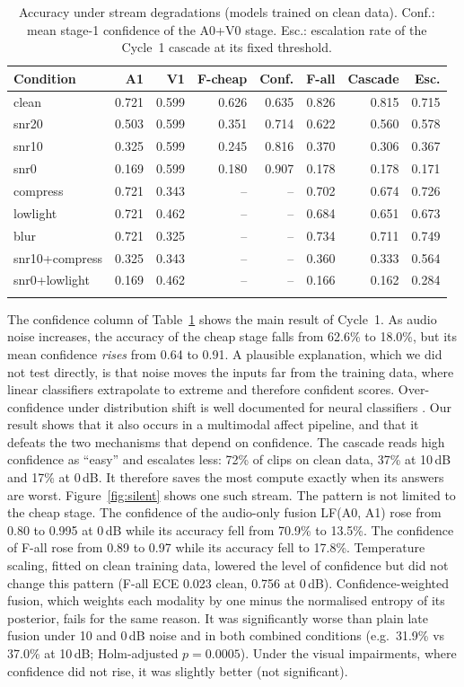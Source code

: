 \begin{table}[t]
\caption{Accuracy under stream degradations (models trained on clean data). Conf.: mean stage-1 confidence of the A0+V0 stage. Esc.: escalation rate of the Cycle~1 cascade at its fixed threshold.}\label{tab:robust}
\centering\footnotesize
\begin{tabular}{@{}lrrrrrrr@{}}
\toprule
Condition & A1 & V1 & F-cheap & Conf. & F-all & Cascade & Esc. \\
\midrule
clean & 0.721 & 0.599 & 0.626 & 0.635 & 0.826 & 0.815 & 0.715 \\
snr20 & 0.503 & 0.599 & 0.351 & 0.714 & 0.622 & 0.560 & 0.578 \\
snr10 & 0.325 & 0.599 & 0.245 & 0.816 & 0.370 & 0.306 & 0.367 \\
snr0 & 0.169 & 0.599 & 0.180 & 0.907 & 0.178 & 0.178 & 0.171 \\
compress & 0.721 & 0.343 & -- & -- & 0.702 & 0.674 & 0.726 \\
lowlight & 0.721 & 0.462 & -- & -- & 0.684 & 0.651 & 0.673 \\
blur & 0.721 & 0.325 & -- & -- & 0.734 & 0.711 & 0.749 \\
snr10+compress & 0.325 & 0.343 & -- & -- & 0.360 & 0.333 & 0.564 \\
snr0+lowlight & 0.169 & 0.462 & -- & -- & 0.166 & 0.162 & 0.284 \\
\botrule
\end{tabular}
\end{table}

The confidence column of Table~\ref{tab:robust} shows the main result of Cycle~1. As audio noise increases, the accuracy of the cheap stage falls from 62.6\% to 18.0\%, but its mean confidence \emph{rises} from 0.64 to 0.91. A plausible explanation, which we did not test directly, is that noise moves the inputs far from the training data, where linear classifiers extrapolate to extreme and therefore confident scores. Over-confidence under distribution shift is well documented for neural classifiers \citep{ovadia2019}. Our result shows that it also occurs in a multimodal affect pipeline, and that it defeats the two mechanisms that depend on confidence. The cascade reads high confidence as ``easy'' and escalates less: 72\% of clips on clean data, 37\% at 10\,dB and 17\% at 0\,dB. It therefore saves the most compute exactly when its answers are worst. Figure~\ref{fig:silent} shows one such stream. The pattern is not limited to the cheap stage. The confidence of the audio-only fusion LF(A0, A1) rose from 0.80 to 0.995 at 0\,dB while its accuracy fell from 70.9\% to 13.5\%. The confidence of F-all rose from 0.89 to 0.97 while its accuracy fell to 17.8\%. Temperature scaling, fitted on clean training data, lowered the level of confidence but did not change this pattern (F-all ECE 0.023 clean, 0.756 at 0\,dB). Confidence-weighted fusion, which weights each modality by one minus the normalised entropy of its posterior, fails for the same reason. It was significantly worse than plain late fusion under 10 and 0\,dB noise and in both combined conditions (e.g.\ 31.9\% vs 37.0\% at 10\,dB; Holm-adjusted $p=0.0005$). Under the visual impairments, where confidence did not rise, it was slightly better (not significant).

